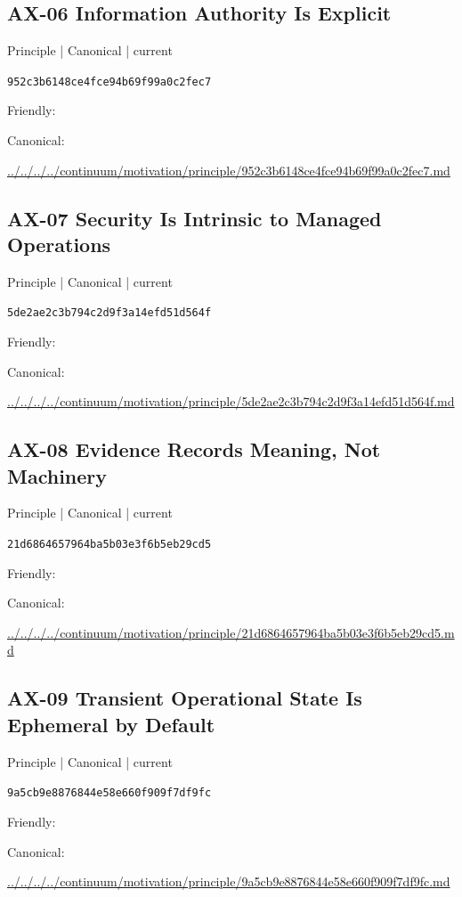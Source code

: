 \documentclass[10pt,a4paper]{article}
\begin{document}
\subsection*{AX-06 Information Authority Is Explicit}
{\small Principle | Canonical | current}\par
\texttt{952c3b6148ce4fce94b69f99a0c2fec7}\par
Friendly: \par
Canonical: \par
{\footnotesize\url{../../../../continuum/motivation/principle/952c3b6148ce4fce94b69f99a0c2fec7.md}}\par
\subsection*{AX-07 Security Is Intrinsic to Managed Operations}
{\small Principle | Canonical | current}\par
\texttt{5de2ae2c3b794c2d9f3a14efd51d564f}\par
Friendly: \par
Canonical: \par
{\footnotesize\url{../../../../continuum/motivation/principle/5de2ae2c3b794c2d9f3a14efd51d564f.md}}\par
\subsection*{AX-08 Evidence Records Meaning, Not Machinery}
{\small Principle | Canonical | current}\par
\texttt{21d6864657964ba5b03e3f6b5eb29cd5}\par
Friendly: \par
Canonical: \par
{\footnotesize\url{../../../../continuum/motivation/principle/21d6864657964ba5b03e3f6b5eb29cd5.md}}\par
\subsection*{AX-09 Transient Operational State Is Ephemeral by Default}
{\small Principle | Canonical | current}\par
\texttt{9a5cb9e8876844e58e660f909f7df9fc}\par
Friendly: \par
Canonical: \par
{\footnotesize\url{../../../../continuum/motivation/principle/9a5cb9e8876844e58e660f909f7df9fc.md}}\par
\end{document}
